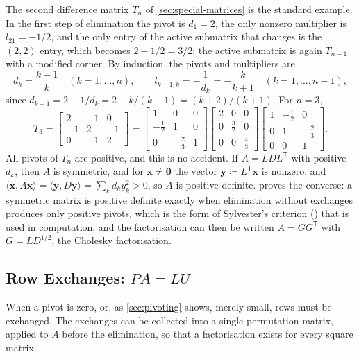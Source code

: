 The second difference matrix $T_n$ of \cref{sec:special-matrices} is the standard example. In the first step of elimination the pivot is $d_1=2$, the only nonzero multiplier is $l_{21}=-1/2$, and the only entry of the active submatrix that changes is the $(2,2)$ entry, which becomes $2-1/2=3/2$; the active submatrix is again $T_{n-1}$ with a modified corner. By induction, the pivots and multipliers are
\[
d_k=\frac{k+1}k\quad(k=1,\ldots,n),\qquad l_{k+1,k}=-\frac1{d_k}=-\frac k{k+1}\quad(k=1,\ldots,n-1),
\]
since $d_{k+1}=2-1/d_k=2-k/(k+1)=(k+2)/(k+1)$. For $n=3$,
\[
T_3=\begin{bmatrix}2&-1&0\\-1&2&-1\\0&-1&2\end{bmatrix}=\begin{bmatrix}1&0&0\\-\frac12&1&0\\0&-\frac23&1\end{bmatrix}\begin{bmatrix}2&0&0\\0&\frac32&0\\0&0&\frac43\end{bmatrix}\begin{bmatrix}1&-\frac12&0\\0&1&-\frac23\\0&0&1\end{bmatrix}.
\]
All pivots of $T_n$ are positive, and this is no accident. If $A=LDL^{\mathsf T}$ with positive $d_k$, then $A$ is symmetric, and for $\mathbf x\ne\mathbf 0$ the vector $\mathbf y\coloneqq L^{\mathsf T}\mathbf x$ is nonzero, and $\langle\mathbf x,A\mathbf x\rangle=\langle\mathbf y,D\mathbf y\rangle=\sum_kd_ky_k^2>0$, so $A$ is positive definite.  proves the converse: a symmetric matrix is positive definite exactly when elimination without exchanges produces only positive pivots, which is the form of Sylvester's criterion () that is used in computation, and the factorisation can then be written $A=GG^{\mathsf T}$ with $G=LD^{1/2}$, the Cholesky factorisation.

\subsection{Row Exchanges: \texorpdfstring{$PA=LU$}{PA = LU}}

When a pivot is zero, or, as \cref{sec:pivoting} shows, merely small, rows must be exchanged. The exchanges can be collected into a single permutation matrix, applied to $A$ before the elimination, so that a factorisation exists for every square matrix.

